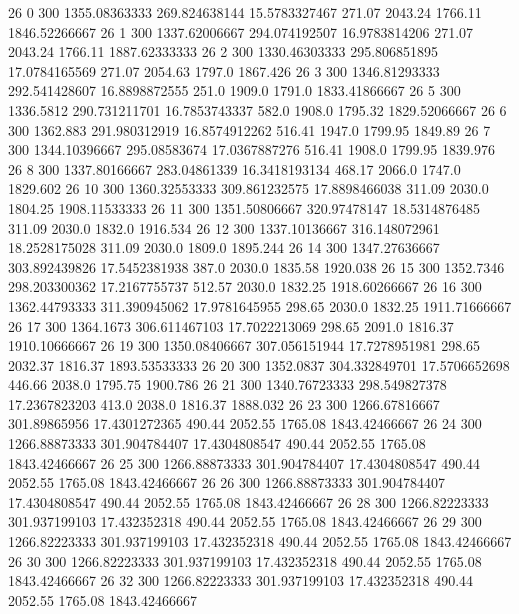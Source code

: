 26  0  300  1355.08363333  269.824638144  15.5783327467  271.07  2043.24  1766.11  1846.52266667 
26  1  300  1337.62006667  294.074192507  16.9783814206  271.07  2043.24  1766.11  1887.62333333 
26  2  300  1330.46303333  295.806851895  17.0784165569  271.07  2054.63  1797.0  1867.426 
26  3  300  1346.81293333  292.541428607  16.8898872555  251.0  1909.0  1791.0  1833.41866667 
26  5  300  1336.5812  290.731211701  16.7853743337  582.0  1908.0  1795.32  1829.52066667 
26  6  300  1362.883  291.980312919  16.8574912262  516.41  1947.0  1799.95  1849.89 
26  7  300  1344.10396667  295.08583674  17.0367887276  516.41  1908.0  1799.95  1839.976 
26  8  300  1337.80166667  283.04861339  16.3418193134  468.17  2066.0  1747.0  1829.602 
26  10  300  1360.32553333  309.861232575  17.8898466038  311.09  2030.0  1804.25  1908.11533333 
26  11  300  1351.50806667  320.97478147  18.5314876485  311.09  2030.0  1832.0  1916.534 
26  12  300  1337.10136667  316.148072961  18.2528175028  311.09  2030.0  1809.0  1895.244 
26  14  300  1347.27636667  303.892439826  17.5452381938  387.0  2030.0  1835.58  1920.038 
26  15  300  1352.7346  298.203300362  17.2167755737  512.57  2030.0  1832.25  1918.60266667 
26  16  300  1362.44793333  311.390945062  17.9781645955  298.65  2030.0  1832.25  1911.71666667 
26  17  300  1364.1673  306.611467103  17.7022213069  298.65  2091.0  1816.37  1910.10666667 
26  19  300  1350.08406667  307.056151944  17.7278951981  298.65  2032.37  1816.37  1893.53533333 
26  20  300  1352.0837  304.332849701  17.5706652698  446.66  2038.0  1795.75  1900.786 
26  21  300  1340.76723333  298.549827378  17.2367823203  413.0  2038.0  1816.37  1888.032 
26  23  300  1266.67816667  301.89865956  17.4301272365  490.44  2052.55  1765.08  1843.42466667 
26  24  300  1266.88873333  301.904784407  17.4304808547  490.44  2052.55  1765.08  1843.42466667 
26  25  300  1266.88873333  301.904784407  17.4304808547  490.44  2052.55  1765.08  1843.42466667 
26  26  300  1266.88873333  301.904784407  17.4304808547  490.44  2052.55  1765.08  1843.42466667 
26  28  300  1266.82223333  301.937199103  17.432352318  490.44  2052.55  1765.08  1843.42466667 
26  29  300  1266.82223333  301.937199103  17.432352318  490.44  2052.55  1765.08  1843.42466667 
26  30  300  1266.82223333  301.937199103  17.432352318  490.44  2052.55  1765.08  1843.42466667 
26  32  300  1266.82223333  301.937199103  17.432352318  490.44  2052.55  1765.08  1843.42466667 

